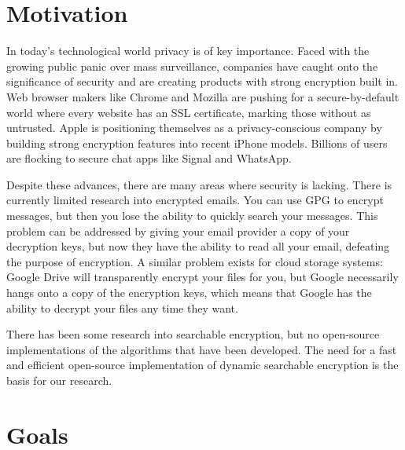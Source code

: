 \documentclass[onecolumn, draftclsnofoot,10pt, compsoc]{IEEEtran}
\begin{document}
\section{Motivation}


In today's technological world privacy is of key importance.
Faced with the growing public panic over mass surveillance,
companies have caught onto the significance of security and are creating products with strong encryption built in.
Web browser makers like Chrome and Mozilla are pushing for a secure-by-default world where every website has an SSL certificate, marking those without as untrusted.
Apple is positioning themselves as a privacy-conscious company by building strong encryption features into recent iPhone models.
Billions of users are flocking to secure chat apps like Signal and WhatsApp.

Despite these advances, there are many areas where security is lacking.
There is currently limited research into encrypted emails.
You can use GPG to encrypt messages, but then you lose the ability to quickly search your messages.
This problem can be addressed by giving your email provider a copy of your decryption keys, but now they have the ability to read all your email, defeating the purpose of encryption.
A similar problem exists for cloud storage systems: Google Drive will transparently encrypt your files for you, but Google necessarily hangs onto a copy of the encryption keys, which means that Google has the ability to decrypt your files any time they want.


There has been some research into searchable encryption, but no open-source implementations of the algorithms that have been developed.
The need for a fast and efficient open-source implementation of dynamic searchable encryption is the basis for our research.



\section{Goals}
\end{document}
